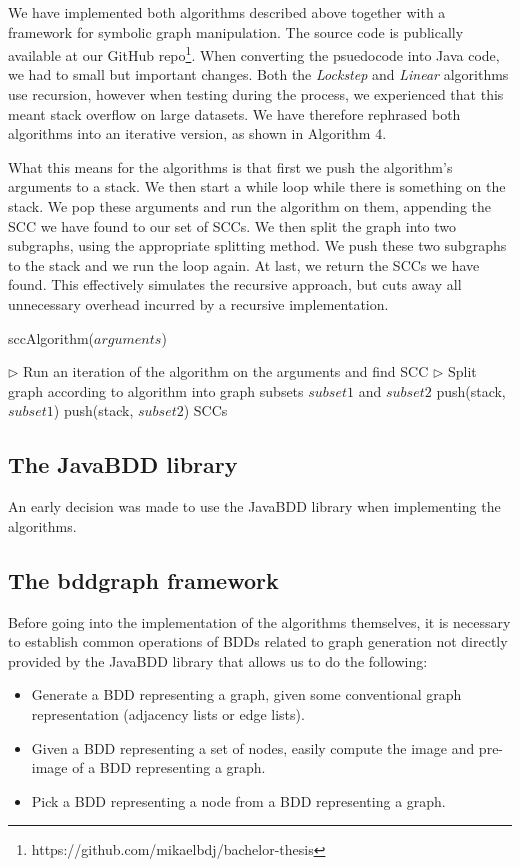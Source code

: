 \documentclass[../master/master.tex]{subfiles}
\begin{document}
We have implemented both algorithms described above together with a framework for
symbolic graph manipulation. The source code is publically available at our GitHub repo\footnote{https://github.com/mikaelbdj/bachelor-thesis}. When converting the psuedocode into Java code, we had to small but important changes. Both the \textit{Lockstep} and \textit{Linear} algorithms use recursion, however when testing during the process, we experienced that this meant stack overflow on large datasets. We have therefore rephrased both algorithms into an iterative version, as shown in Algorithm 4.

What this means for the algorithms is that first we push the algorithm's arguments to a stack. We then start a while loop while there is something on the stack. We pop these arguments and run the algorithm on them, appending the SCC we have found to our set of SCCs. We then split the graph into two subgraphs, using the appropriate splitting method. We push these two subgraphs to the stack and we run the loop again. At last, we return the SCCs we have found. This effectively simulates the recursive approach, but cuts away all unnecessary overhead incurred by a recursive implementation.

\begin{algorithm}[H]
  \caption{sccAlgorithm($arguments$)}
  \begin{algorithmic}[1]
    \Statex
    \State \(\triangleright\) Run an iteration of the algorithm on the arguments and find SCC
    \State \(\triangleright\) Split graph according to algorithm into graph subsets $subset1$ and $subset2$
    \State push(stack, $subset1$)
    \State push(stack, $subset2$)
    \EndWhile
    \Statex
    \State \Return SCCs
  \end{algorithmic}
\end{algorithm}

\subsection{The JavaBDD library}
An early decision was made to use the JavaBDD \cite{whaley} library when implementing the algorithms. 

\subsection{The bddgraph framework}
Before going into the implementation of the algorithms themselves, it is necessary to establish common operations of BDDs related to graph generation not directly provided by the JavaBDD library that allows us to do the following:
\begin{itemize}
\item Generate a BDD representing a graph, given some conventional graph representation (adjacency lists or edge lists).
\item Given a BDD representing a set of nodes, easily compute the image and pre-image of a BDD representing a graph.
\item Pick a BDD representing a node from a BDD representing a graph.
\end{itemize}
\end{document}
